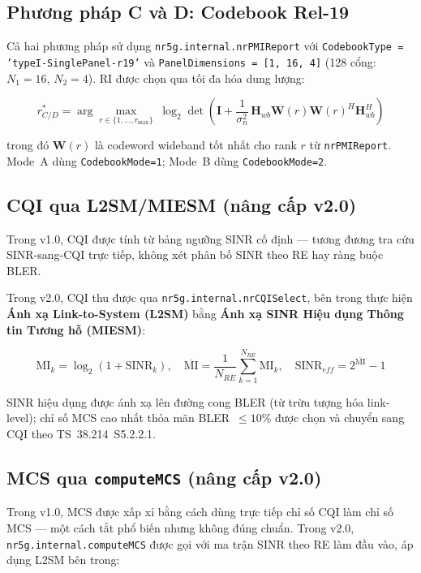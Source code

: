\documentclass[11pt,a4paper]{article}
\begin{document}
\subsection{Phương pháp C và D: Codebook Rel-19}

Cả hai phương pháp sử dụng \texttt{nr5g.internal.nrPMIReport} với
\texttt{CodebookType = 'typeI-SinglePanel-r19'} và
\texttt{PanelDimensions = [1, 16, 4]} (128 cổng: $N_1=16$, $N_2=4$).
RI được chọn qua tối đa hóa dung lượng:

\begin{equation}
r_{C/D}^* = \arg\max_{r \in \{1,\ldots,r_{\max}\}}\;
\log_2 \det\!\left(\mathbf{I} + \frac{1}{\sigma_n^2}\,
\mathbf{H}_{wb}\mathbf{W}(r)\mathbf{W}(r)^H\mathbf{H}_{wb}^H\right)
\end{equation}

trong đó $\mathbf{W}(r)$ là codeword wideband tốt nhất cho rank $r$ từ
\texttt{nrPMIReport}. Mode~A dùng \texttt{CodebookMode=1};
Mode~B dùng \texttt{CodebookMode=2}.

\subsection{CQI qua L2SM/MIESM (nâng cấp v2.0)}

Trong v1.0, CQI được tính từ bảng ngưỡng SINR cố định --- tương đương tra cứu
SINR-sang-CQI trực tiếp, không xét phân bố SINR theo RE hay ràng buộc BLER.

Trong v2.0, CQI thu được qua \texttt{nr5g.internal.nrCQISelect}, bên trong
thực hiện \textbf{Ánh xạ Link-to-System (L2SM)} bằng
\textbf{Ánh xạ SINR Hiệu dụng Thông tin Tương hỗ (MIESM)}:

\begin{equation}
\text{MI}_k = \log_2(1 + \text{SINR}_k), \quad
\overline{\text{MI}} = \frac{1}{N_{RE}}\sum_{k=1}^{N_{RE}}\text{MI}_k, \quad
\text{SINR}_{eff} = 2^{\overline{\text{MI}}} - 1
\end{equation}

SINR hiệu dụng được ánh xạ lên đường cong BLER (từ trừu tượng hóa link-level);
chỉ số MCS cao nhất thỏa mãn BLER~$\leq 10\%$ được chọn và chuyển sang CQI theo
TS~38.214~S5.2.2.1.

\subsection{MCS qua \texttt{computeMCS} (nâng cấp v2.0)}

Trong v1.0, MCS được xấp xỉ bằng cách dùng trực tiếp chỉ số CQI làm chỉ số MCS ---
một cách tắt phổ biến nhưng không đúng chuẩn. Trong v2.0,
\texttt{nr5g.internal.computeMCS} được gọi với ma trận SINR theo RE làm đầu vào,
áp dụng L2SM bên trong:
\end{document}
